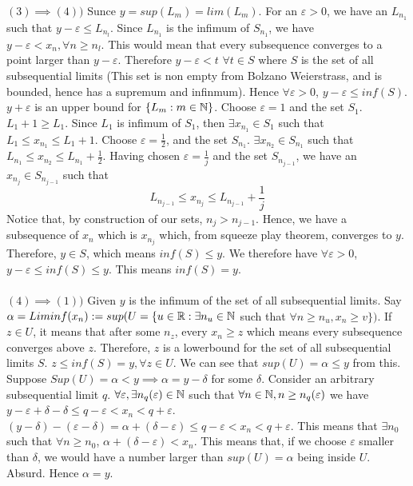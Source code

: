 \documentclass[../Main.tex]{subfiles}
\begin{document}
{$(3) \implies (4))$ Sunce $y=sup(L_m)=lim(L_m)$. For an $\varepsilon>0$, we have an $L_{n_1}$ such that $y-\varepsilon \leq L_{n_l}$. Since $L_{n_1}$ is the infimum of $S_{n_1}$, we have $y-\varepsilon< x_n, \forall n \geq n_l$. This would mean that every subsequence converges to a point larger than $y-\varepsilon$. Therefore $y-\varepsilon<t$ $\forall t \in S$ where $S$ is the set of all subsequential limits (This set is non empty from Bolzano Weierstrass, and is bounded, hence has a supremum and infinmum). Hence $\forall \varepsilon>0$, $y-\varepsilon\leq inf(S)$. $y+\varepsilon$ is an upper bound for $\{L_m: m\in \mathbb N\}$. Choose $\varepsilon=1$ and the set $S_1$. $L_1+1\geq L_1$. Since $L_1$ is infimum of $S_1$, then $\exists x_{n_1} \in S_1$ such that $L_1 \leq x_{n_1} \leq L_1+1$. Choose $\varepsilon=\frac{1}{2}$, and the set $S_{n_1}$. $\exists x_{n_2} \in S_{n_1}$ such that $L_{n_1} \leq x_{n_2} \leq L_{n_1}+\frac{1}{2}$. Having chosen $\varepsilon=\frac{1}{j}$ and the set $S_{n_{j-1}}$, we have an $x_{n_j} \in S_{n_{j-1}}$ such that $$L_{n_{j-1}} \leq x_{n_j} \leq L_{n_{j-1}}+\frac{1}{j}$$ Notice that, by construction of our sets, $n_j>n_{j-1}$. Hence, we have a subsequence of $x_n$ which is $x_{n_j}$ which, from squeeze play theorem, converges to $y$. Therefore, $y \in S$, which means $inf(S) \leq y$. We therefore have $\forall \varepsilon>0$, $y-\varepsilon \leq inf(S) \leq y$. This means $inf(S)=y$.\\\\
$(4)\implies (1))$ Given $y$ is the infimum of the set of all subsequential limits. Say $\alpha=Liminf(x_n):= sup (U=\{u \in \mathbb R: \exists n_u \in \mathbb N$ such that $ \forall n \geq n_u, x_n \geq v \})$. If $z \in U$, it means that after some $n_z$, every $x_n \geq z$ which means every subsequence converges above $z$. Therefore, $z$ is a lowerbound for the set of all subsequential limits $S$. $z \leq inf(S)=y, \forall z \in U$. We can see that $sup(U)=\alpha \leq y$ from this. Suppose $Sup(U)=\alpha < y \implies \alpha=y-\delta$ for some $\delta$. Consider an arbitrary subsequential limit $q$. $\forall \varepsilon, \exists n_q(\varepsilon) \in \mathbb N$ such that $\forall n \in \mathbb N, n \geq n_q(\varepsilon)$ we have $y-\varepsilon+\delta-\delta \leq q-\varepsilon<x_n<q+\varepsilon$. 
$(y-\delta)-(\varepsilon-\delta)=\alpha+(\delta-\varepsilon) \leq q-\varepsilon<x_n<q+\varepsilon$. 
This means that $\exists n_0$ such that $\forall n \geq n_0$, $\alpha+(\delta-\varepsilon)<x_n$. This means that, if we choose $\varepsilon$ smaller than $\delta$, we would have a number larger than $sup(U)=\alpha$ being inside $U$. Absurd. Hence $\alpha=y$.
}
\end{document}
